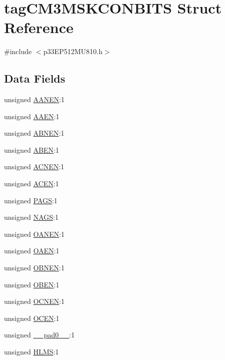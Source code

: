 \hypertarget{structtag_c_m3_m_s_k_c_o_n_b_i_t_s}{}\section{tag\+C\+M3\+M\+S\+K\+C\+O\+N\+B\+I\+TS Struct Reference}
\label{structtag_c_m3_m_s_k_c_o_n_b_i_t_s}


{\ttfamily \#include $<$p33\+E\+P512\+M\+U810.\+h$>$}

\subsection*{Data Fields}
\begin{DoxyCompactItemize}
\item 
unsigned \hyperlink{structtag_c_m3_m_s_k_c_o_n_b_i_t_s_a6ea89b9cbdf0bbde3ec8147513e70fa0}{A\+A\+N\+EN}\+:1
\item 
unsigned \hyperlink{structtag_c_m3_m_s_k_c_o_n_b_i_t_s_a58bba29325ff11212a73bae4b2b1a707}{A\+A\+EN}\+:1
\item 
unsigned \hyperlink{structtag_c_m3_m_s_k_c_o_n_b_i_t_s_a1b2c756ac7255e490499f85cb2d746f3}{A\+B\+N\+EN}\+:1
\item 
unsigned \hyperlink{structtag_c_m3_m_s_k_c_o_n_b_i_t_s_abae9997777bf70f8cf9132c18db1e83d}{A\+B\+EN}\+:1
\item 
unsigned \hyperlink{structtag_c_m3_m_s_k_c_o_n_b_i_t_s_af825e9ea0f6690d86c6ca9bda2e82eb1}{A\+C\+N\+EN}\+:1
\item 
unsigned \hyperlink{structtag_c_m3_m_s_k_c_o_n_b_i_t_s_a24d602e77c5a5ec039de0ff29062d01b}{A\+C\+EN}\+:1
\item 
unsigned \hyperlink{structtag_c_m3_m_s_k_c_o_n_b_i_t_s_af5feed07d2e415c635200336f0f05e41}{P\+A\+GS}\+:1
\item 
unsigned \hyperlink{structtag_c_m3_m_s_k_c_o_n_b_i_t_s_ac2ecf95cef4a90da8a3ad0a239927fd2}{N\+A\+GS}\+:1
\item 
unsigned \hyperlink{structtag_c_m3_m_s_k_c_o_n_b_i_t_s_a8b7682af91333014cf4ab125c6a6fe8d}{O\+A\+N\+EN}\+:1
\item 
unsigned \hyperlink{structtag_c_m3_m_s_k_c_o_n_b_i_t_s_a899903902775809e354711c79071013b}{O\+A\+EN}\+:1
\item 
unsigned \hyperlink{structtag_c_m3_m_s_k_c_o_n_b_i_t_s_afa6d54b4c9f6bf6feb885f00044987b2}{O\+B\+N\+EN}\+:1
\item 
unsigned \hyperlink{structtag_c_m3_m_s_k_c_o_n_b_i_t_s_a69019780861408d14c164f55a9995819}{O\+B\+EN}\+:1
\item 
unsigned \hyperlink{structtag_c_m3_m_s_k_c_o_n_b_i_t_s_a8bee27f84106873154bb0f1b9d244ebd}{O\+C\+N\+EN}\+:1
\item 
unsigned \hyperlink{structtag_c_m3_m_s_k_c_o_n_b_i_t_s_ad7c118cfef34dec7ba06f5968b47200c}{O\+C\+EN}\+:1
\item 
unsigned \hyperlink{structtag_c_m3_m_s_k_c_o_n_b_i_t_s_adf71f3d8410c1f1dbbc96680a92c49af}{\+\_\+\+\_\+pad0\+\_\+\+\_\+}\+:1
\item 
unsigned \hyperlink{structtag_c_m3_m_s_k_c_o_n_b_i_t_s_ae12e5557e1ca033e11465acebb086d49}{H\+L\+MS}\+:1
\end{DoxyCompactItemize}


